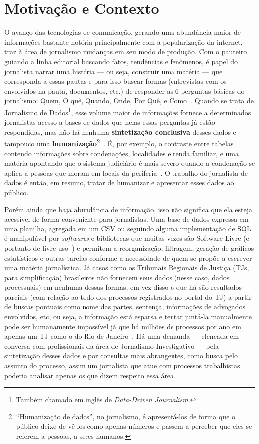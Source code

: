 \section{Motivação e Contexto~\label{sec:Motivação-e-Contexto}}

O avanço das tecnologias de comunicação, gerando uma abundância maior de
informações bastante notória principalmente com a popularização da internet,
traz à área de jornalismo mudanças em seu modo de produção. Com o pauteiro
guiando a linha editorial buscando fatos, tendências e fenômenos, é papel do
jornalista narrar uma história --- ou seja, construir uma matéria ---  que
corresponda a essas pautas e para isso buscar formas (entrevistas com os
envolvidos na pauta, documentos, etc.) de responder as 6 perguntas básicas do
jornalismo: Quem, O quê, Quando, Onde, Por Quê, e
Como~\cite{ijnet:examinando-perguntas-jornalismo}. Quando se trata de
Jornalismo de Dados\footnote{Também chamado em inglês de \textit{Data-Driven
Journalism}.}, esse volume maior de informações fornece a determinados
jornalistas acesso a bases de dados que nelas essas perguntas já estão
respondidas, mas não há nenhuma \textbf{sintetização conclusiva} desses dados e
tampouco uma \textbf{humanização}\footnote{``Humanização de dados'', no
jornalismo, é apresentá-los de forma que o público deixe de vê-los como apenas
números e passem a perceber que eles se referem a pessoas, a seres
humanos.}~\cite{ijnet:como-humanizar-dados}. É, por exemplo, o contraste entre
tabelas contendo informações sobre condenações, localidades e renda familiar, e
uma matéria apontando que o sistema judiciário é mais severo quando a
condenação se aplica a pessoas que moram em locais da
periferia~\cite{news:sentenças-mais-severas-para-periferia}. O trabalho do
jornalista de dados é então, em resumo, tratar de humanizar e apresentar esses
dados ao público.

Porém ainda que haja abundância de informação, isso não significa que ela
esteja acessível de forma conveniente para jornalistas. Uma base de dados
expressa em uma planilha, agregada em um CSV ou seguindo alguma implementação
de SQL é manipulável por \textit{softwares} e bibliotecas que muitas vezes são
Software-Livre (e portanto de livre uso~\cite{def:free-software}) e permitem a
reorganização, filtragem, geração de gráficos estatísticos e outras tarefas
conforme a necessidade de quem se propõe a escrever uma matéria jornalística.
Já casos como os Tribunais Regionais de Justiça (TJs, para simplificação)
brasileiros não fornecem seus dados (nesse caso, dados processuais) em nenhuma
dessas formas, em vez disso o que há são resultados parciais (com relação ao
todo dos processos registrados no portal do TJ) a partir de buscas pontuais
como nome das partes, sentença, informações de advogados envolvidos, etc, ou
seja, a informação está esparsa e tentar juntá-la manualmente pode ser
humanamente impossível já que há milhões de processos por ano em apenas um TJ
como o do Rio de Janeiro~\cite{tjrj}. Há uma demanda --- elencada em conversa
com profissionais da área de Jornalismo Investigativo --- pela sintetização
desses dados e por consultas mais abrangentes, como busca pelo assunto do
processo, assim um jornalista que atue com processos trabalhistas poderia
analisar apenas os que dizem respeito essa área.

